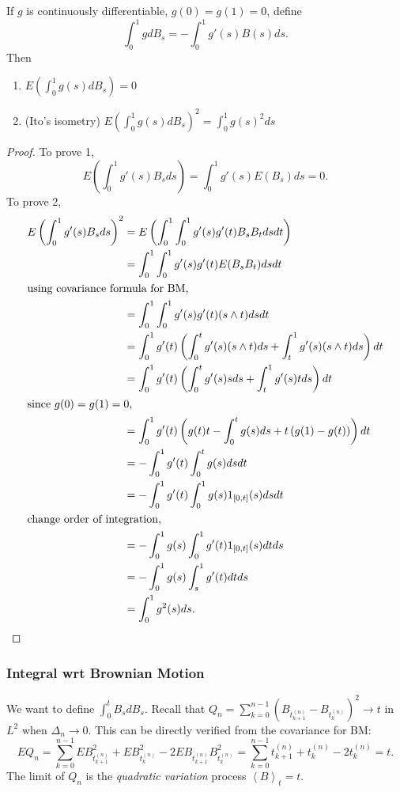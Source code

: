 \begin{definition}
	If $g$ is continuously differentiable, $g(0) = g(1) = 0$, define
	\[
		\int _0^1 g d B_s = - \int _0^1 g'(s) B(s) ds
	.\] 
	Then
	\begin{enumerate}
		\item $E\left( \int _0^1 g(s) d B_s  \right)  = 0$
		\item (Ito's isometry) $E\left( \int _0^1 g(s) d B_s \right) ^2 = \int _0^1 g(s)^2 ds$
	\end{enumerate}
\end{definition}
\begin{proof}
	To prove 1,
	\[
		E\left( \int _0^1 g'(s) B_s ds  \right) 
		= \int _0^1 g'(s) E(B_s) ds = 0
	.\] 
	To prove 2,
	\begin{align*}
		E\left( \int _0^1 g'(s) B_s ds \right) ^2
		&= E\left( \int _0^1 \int _0^1 g'(s) g'(t) B_s B_t ds dt \right)  \\
		&= \int _0^1 \int _0^1 g'(s) g'(t) E(B_s B_t) ds dt \\
		\intertext{using covariance formula for BM,}
		&= \int _0^1 \int _0^1 g'(s) g'(t) (s \wedge t) ds dt \\
		&= \int _0^1 g'(t) \left(\int _0^t g'(s) (s \wedge t) ds + \int _t^1 g'(s) (s \wedge t) ds \right) dt \\
		&= \int _0^1 g'(t) \left(\int _0^t g'(s) s ds + \int _t^1 g'(s) t ds \right) dt \\
		\intertext{since $g(0) = g(1) = 0$,}
		&= \int _0^1 g'(t) \left(g(t) t - \int _0^t g(s) ds + t\left( g(1) - g(t) \right) \right) dt \\
		&= - \int _0^1 g'(t) \int _0^t g(s) ds dt \\
		&= - \int _0^1 g'(t) \int _0^1 g(s) 1_{[0,t]}(s) ds dt \\
		\intertext{change order of integration,}
		&= - \int _0^1 g(s) \int_0^1 g'(t) 1_{[0,t]}(s) dt ds \\
		&= - \int _0^1 g(s) \int_s^1 g'(t) dt ds \\
		&= \int _0^1 g^2(s) ds
	.\end{align*}
\end{proof}

\subsubsection{Integral wrt Brownian Motion}

We want to define  $\int _0^t B_s d B_s$.
Recall that $Q_n = \sum_{k=0}^{n-1} \left( B_{t_{k+1}^{(n)}} - B_{t_{k}^{(n)}} \right)^2 \to  t$ in $L^2$ when $\Delta_n \to  0$. This can be directly verified from the covariance for BM:
\[
	E Q_n = 
	\sum_{k=0}^{n-1} E B_{t_{k+1}^{(n)}}^2 + E B_{t_{k}^{(n)}}^2 - 2 EB_{t_{k+1}^{(n)}}B_{t_{k}^{(n)}}^2
	=
	\sum_{k=0}^{n-1} t_{k+1}^{(n)} + t_{k}^{(n)} - 2 t_{k}^{(n)} = t
.\] 
The limit of $Q_n$ is the \textit{quadratic variation} process $\left\langle B \right\rangle _t = t$.

